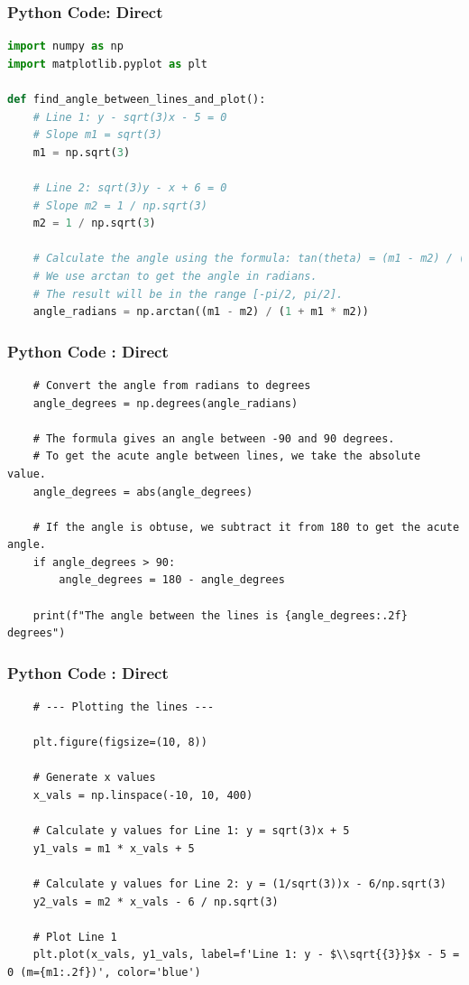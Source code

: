 \documentclass{beamer}
\begin{document}
\begin{frame}[fragile]
\frametitle{Python Code: Direct}
\begin{lstlisting}[language=Python]
import numpy as np
import matplotlib.pyplot as plt

def find_angle_between_lines_and_plot():
    # Line 1: y - sqrt(3)x - 5 = 0 
    # Slope m1 = sqrt(3)
    m1 = np.sqrt(3)

    # Line 2: sqrt(3)y - x + 6 = 0  
    # Slope m2 = 1 / np.sqrt(3)
    m2 = 1 / np.sqrt(3)

    # Calculate the angle using the formula: tan(theta) = (m1 - m2) / (1 + m1 * m2)
    # We use arctan to get the angle in radians.
    # The result will be in the range [-pi/2, pi/2].
    angle_radians = np.arctan((m1 - m2) / (1 + m1 * m2))
\end{lstlisting}

\end{frame}
\begin{frame}[fragile]
\frametitle{Python Code : Direct}

\begin{lstlisting}
    # Convert the angle from radians to degrees
    angle_degrees = np.degrees(angle_radians)

    # The formula gives an angle between -90 and 90 degrees.
    # To get the acute angle between lines, we take the absolute value.
    angle_degrees = abs(angle_degrees)

    # If the angle is obtuse, we subtract it from 180 to get the acute angle.
    if angle_degrees > 90:
        angle_degrees = 180 - angle_degrees

    print(f"The angle between the lines is {angle_degrees:.2f} degrees")
\end{lstlisting}

\end{frame}
\begin{frame}[fragile]
\frametitle{Python Code : Direct}

\begin{lstlisting}
    # --- Plotting the lines ---

    plt.figure(figsize=(10, 8))

    # Generate x values
    x_vals = np.linspace(-10, 10, 400)

    # Calculate y values for Line 1: y = sqrt(3)x + 5
    y1_vals = m1 * x_vals + 5

    # Calculate y values for Line 2: y = (1/sqrt(3))x - 6/np.sqrt(3)
    y2_vals = m2 * x_vals - 6 / np.sqrt(3)

    # Plot Line 1
    plt.plot(x_vals, y1_vals, label=f'Line 1: y - $\\sqrt{{3}}$x - 5 = 0 (m={m1:.2f})', color='blue')
\end{lstlisting}

\end{frame}
\end{document}
